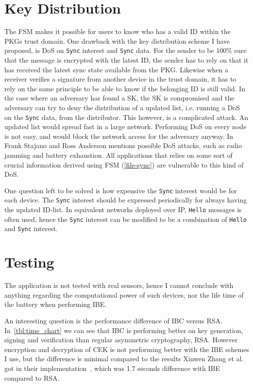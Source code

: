 \section{Key Distribution}
The \gls{FSM} makes it possible for users to know who has a valid \gls{ID} within the \gls{PKG}s trust domain.
One drawback with the key distribution scheme I have proposed, is \gls{DoS} on \texttt{Sync} \gls{interest} and \texttt{Sync} \gls{data}. 
For the sender to be 100\% sure that the message is encrypted with the latest \gls{ID}, the sender has to rely on that it has received the latest sync state available from the \gls{PKG}.
Likewise when a receiver verifies a signature from another device in the trust domain, it has to rely on the same principle to be able to know if the belonging \gls{ID} is still valid.
In the case where an adversary has found a \gls{SK}, the \gls{SK} is compromised and the adversary can try to deny the distribution of a updated list, i.e. running a \gls{DoS} on the \texttt{Sync} \gls{data}, from the distributor. 
This however, is a complicated attack.
An updated list would spread fast in a large network.
Performing \gls{DoS} on every node is not easy, and would block the network access for the adversary anyway.
In~\cite{DBLP:conf/spw/StajanoA99} Frank Stajano and Ross Anderson mentions possible \gls{DoS} attacks, such as radio jamming and battery exhaustion. 
All applications that relies on some sort of crucial information derived using \gls{FSM} (\autoref{file-sync}) are vulnerable to this kind of \gls{DoS}.

One question left to be solved is how expensive the \texttt{Sync} \gls{interest} would be for each device. 
The \texttt{Sync} \gls{interest} should be expressed periodically for always having the updated ID-list. 
In equivalent networks deployed over \gls{IP}, \texttt{Hello} messages is often used, hence the \texttt{Sync} \gls{interest} can be modified to be a combination of \texttt{Hello} and \texttt{Sync} \gls{interest}.

\section{Testing}
The application is not tested with real sensors, hence I cannot conclude with anything regarding the computational power of such devices, nor the life time of the battery when performing \gls{IBE}.

An interesting question is the performance difference of \gls{IBC} versus RSA.
In~\autoref{tbl:time_chart} we can see that \gls{IBC} is performing better on key generation, signing and verification than regular asymmetric cryptography, RSA. 
However encryption and decryption of \gls{CEK} is not performing better with the \gls{IBE} schemes I use, but the difference is minimal compared to the results Xinwen Zhang et al. got in their implementation~\cite{DBLP:conf/icnp/ZhangCXWSW11}, which was 1.7 seconds difference with \gls{IBE} compared to RSA.

